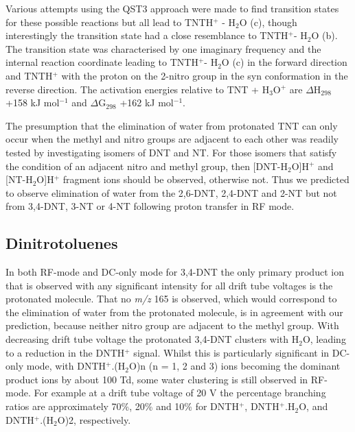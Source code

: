 Various attempts using the QST3 approach were made to find transition states for these possible reactions but all lead to TNTH$^+$ - H$_2$O (c), though interestingly the transition state had a close resemblance to TNTH$^+$- H$_2$O (b). The transition state was characterised by one imaginary frequency and the internal reaction coordinate leading to TNTH$^+$- H$_2$O (c) in the forward direction and TNTH$^+$ with the proton on the 2-nitro group in the syn conformation in the reverse direction. The activation energies relative to TNT + H$_3$O$^+$ are $\Delta$H$_{298}$ +158 kJ mol$^{-1}$ and $\Delta$G$_{298}$ +162 kJ mol$^{-1}$. 

The presumption that the elimination of water from protonated TNT can only occur when the methyl and nitro groups are adjacent to each other was readily tested by investigating isomers of DNT and NT. For those isomers that satisfy the condition of an adjacent nitro and methyl group, then [DNT-H$_2$O]H$^+$ and [NT-H$_2$O]H$^+$ fragment ions should be observed, otherwise not. Thus we predicted to observe elimination of water from the 2,6-DNT, 2,4-DNT and 2-NT but not from 3,4-DNT, 3-NT or 4-NT following proton transfer in RF mode.







\subsection{Dinitrotoluenes}
In both RF-mode and DC-only mode for 3,4-DNT the only primary product ion that is observed with any significant intensity for all drift tube voltages is the protonated molecule. That no \textit{m/z} 165 is observed, which would correspond to the elimination of water from the protonated molecule, is in agreement with our prediction, because neither nitro group are adjacent to the methyl group. With decreasing drift tube voltage the protonated 3,4-DNT clusters with H$_2$O, leading to a reduction in the DNTH$^+$ signal. Whilst this is particularly
significant in DC-only mode, with DNTH$^+$.(H$_2$O)n (n = 1, 2 and 3) ions becoming the dominant product ions by about 100 Td, some water clustering is still observed in RF-mode. For example at a drift tube voltage of 20 V the percentage branching ratios are approximately 70\%, 20\% and 10\% for DNTH$^+$, DNTH$^+$.H$_2$O, and DNTH$^+$.(H$_2$O)2, respectively. 

